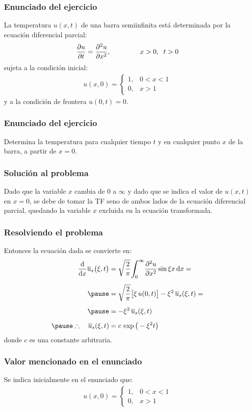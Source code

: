\documentclass[12pt]{beamer}
\begin{document}
\begin{frame}
\frametitle{Enunciado del ejercicio}
La temperatura $u (x, t)$ de una barra semiinfinita está determinada por la ecuación diferencial parcial:
\pause
\begin{align*}
\pdv{u}{t} = \pdv[2]{u}{x}, \hspace{1.5cm} x > 0, \hspace{0.2cm} t > 0
\end{align*}
sujeta a la condición inicial:
\pause
\begin{align*}
u(x, 0) = \begin{cases}
1, & 0 < x < 1 \\
0, & x > 1
\end{cases}
\end{align*}
y a la condición de frontera $u(0, t) = 0$.
\end{frame}
\begin{frame}
\frametitle{Enunciado del ejercicio}
Determina la temperatura para cualquier tiempo $t$ y en cualquier punto $x$ de la barra, a partir de $x = 0$.
\end{frame}
\begin{frame}
\frametitle{Solución al problema}
Dado que la variable $x$ cambia de $0$ a $\infty$ y dado que se indica el valor de $u (x, t)$ en $x = 0$, \pause se debe de tomar la TF seno de ambos lados de la ecuación diferencial parcial, quedando la variable $x$ excluida en la ecuación transformada.
\end{frame}
\begin{frame}
\frametitle{Resolviendo el problema}
Entonces la ecuación dada se convierte en:
\pause
\begin{eqnarray}
\begin{aligned}[b]
\dv{x} \overline{u}_{s} \big( \xi, t \big) &= \sqrt{\dfrac{2}{\pi}} \scaleint{6ex}_{\bs 0}^{\infty} \pdv[2]{u}{x} \sin \xi x \dd{x} = \\[0.5em] \pause
&= \sqrt{\dfrac{2}{\pi}} \big[ \xi \, u(0, t) \big] - \xi^{2} \, \overline{u}_{s} (\xi, t) = \\[0.5em] \pause
&= - \xi^{2} \, \overline{u}_{s} (\xi, t) \\[0.5em] \pause
\therefore \quad \overline{u}_{s} (\xi, t) &= c \, \exp\big( - \xi^{2} t \big)
\end{aligned}
\label{eq:ecuacion_ejemplo_01_i}
\end{eqnarray}
donde $c$ es una constante arbitraria.
\end{frame}
\begin{frame}
\frametitle{Valor mencionado en el enunciado}
Se indica inicialmente en el enunciado que:
\pause
\begin{align*}
u(x, 0) = \begin{cases}
1, & 0 < x < 1 \\
0, & x > 1
\end{cases}
\end{align*}
\end{frame}
\end{document}
